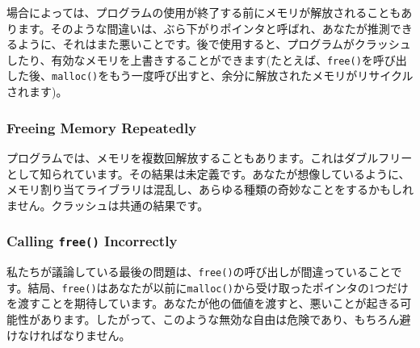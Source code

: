 場合によっては、プログラムの使用が終了する前にメモリが解放されることもあります。そのような間違いは、ぶら下がりポインタと呼ばれ、あなたが推測できるように、それはまた悪いことです。後で使用すると、プログラムがクラッシュしたり、有効なメモリを上書きすることができます(たとえば、\texttt{free()}を呼び出した後、\texttt{malloc()}をもう一度呼び出すと、余分に解放されたメモリがリサイクルされます)。

\hypertarget{freeing-memory-repeatedly}{%
\subsubsection*{Freeing Memory
Repeatedly}\label{freeing-memory-repeatedly}}

プログラムでは、メモリを複数回解放することもあります。これはダブルフリーとして知られています。その結果は未定義です。あなたが想像しているように、メモリ割り当てライブラリは混乱し、あらゆる種類の奇妙なことをするかもしれません。クラッシュは共通の結果です。

\hypertarget{calling-free-incorrectly}{%
\subsubsection*{\texorpdfstring{Calling \texttt{free()}
Incorrectly}{Calling free() Incorrectly}}\label{calling-free-incorrectly}}

私たちが議論している最後の問題は、\texttt{free()}の呼び出しが間違っていることです。結局、\texttt{free()}はあなたが以前に\texttt{malloc()}から受け取ったポインタの1つだけを渡すことを期待しています。あなたが他の価値を渡すと、悪いことが起きる可能性があります。したがって、このような無効な自由は危険であり、もちろん避けなければなりません。

